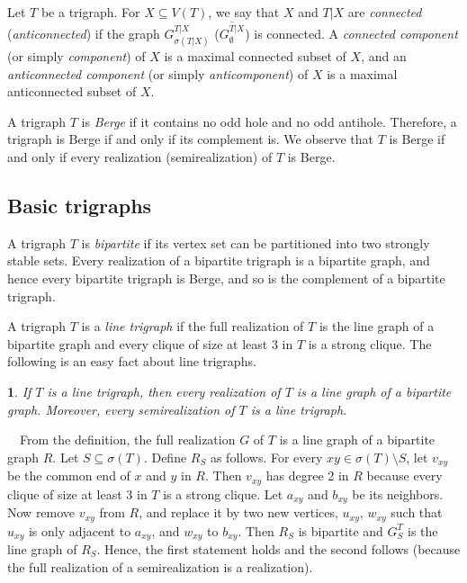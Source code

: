 \documentclass[11 pt] {article}
\newcommand\blackslug{\hbox{\hskip 1pt \vrule width 4pt height 8pt depth 1.5pt
        \hskip 1pt}}
\newcommand\bbox{\hfill \quad \blackslug \medbreak}
\newtheorem{theorem}{}[section]
\newcounter{claim}
\newcommand{\Proof}{\setcounter{claim}{0}\noindent{\bf Proof.}\ \ }
\begin{document}
Let $T$ be a trigraph. For $X \subseteq V(T)$, we say that $X$ and
$T|X$ are {\em connected} ({\em anticonnected}) if the graph
$G^{T|X}_{\sigma (T|X)}$ ($\overline{G^{T|X}_{\emptyset}}$) is
connected. A {\em connected component} (or simply \emph{component}) of
$X$ is a maximal connected subset of $X$, and an {\em anticonnected
component} (or simply \emph{anticomponent}) of $X$ is a maximal
anticonnected subset of $X$.


A trigraph $T$ is {\em Berge} if it contains no odd hole and no odd
antihole. Therefore, a trigraph is Berge if and only if its complement
is. We observe that $T$ is Berge if and only if every realization
(semirealization) of $T$ is Berge.


\subsection{Basic trigraphs}

A trigraph $T$ is {\em bipartite} if its vertex set can be partitioned 
into two strongly stable sets. Every realization of a bipartite 
trigraph is a bipartite graph, and hence every bipartite trigraph is Berge, 
and so is the complement of a bipartite trigraph.

A trigraph $T$ is a {\em line trigraph} if the full realization of $T$
is the line graph of a bipartite graph and every clique of size at
least $3$ in $T$ is a strong clique. The following is an easy fact
about line trigraphs.

\begin{theorem}
\label{linetrig}
If $T$ is a line trigraph, then every realization of $T$ is a line
graph of a bipartite graph.  Moreover, every semirealization of $T$ is
a line trigraph.
\end{theorem}

\Proof From the definition, the full realization $G$ of $T$ is a line
graph of a bipartite graph $R$. Let $S \subseteq \sigma(T)$. Define
$R_S$ as follows. For every $xy \in \sigma(T)\setminus S$, let
$v_{xy}$ be the common end of $x$ and $y$ in $R$. Then $v_{xy}$ has
degree 2 in $R$ because every clique of size at least $3$ in $T$ is a
strong clique. Let $a_{xy}$ and $b_{xy}$ be its neighbors. Now remove
$v_{xy}$ from $R$, and replace it by two new vertices, $u_{xy}$,
$w_{xy}$ such that $u_{xy}$ is only adjacent to $a_{xy}$, and $w_{xy}$
to $b_{xy}$. Then $R_S$ is bipartite and $G_S^T$ is the line graph of
$R_S$.  Hence, the first statement holds and the second follows
(because the full realization of a semirealization is a realization).
\bbox
\end{document}
